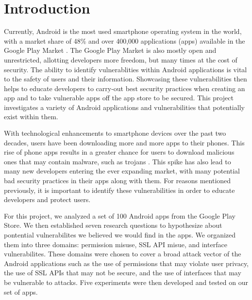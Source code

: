 \section{Introduction}




Currently, Android is the most used smartphone operating system in the world, with a market share of 48\% and over 400,000 applications (apps) available in the Google Play Market \cite{10.1145/2382196.2382205}. The Google Play
Market is also mostly open and unrestricted, allotting developers more freedom, but many times at the cost of security. 
The ability to identify vulnerablities within Android applications is vital to the safety of users and their information. Showcasing these vulnerabilities then
helps to educate developers to carry-out best security practices when creating an app and to take vulnerable apps off the app store to be secured. This project investigates a variety of Android applications and vulnerabilities that potentially 
exist within them. 

With technological enhancements to smartphone devices over the past two decades, users have been downloading more and more apps to their phones. This rise of phone apps results in a greater chance for users to download malicious ones 
that may contain malware, such as trojans \cite{10.1145/1653662.1653691}. This spike has also lead to many new developers entering the ever expanding market, with many potential bad security practices in their apps along with them. For reasons mentioned previously, 
it is important to identify these vulnerabilities in order to educate developers and protect users. 

For this project, we analyzed a set of 100 Android apps from the Google Play Store. We then established seven research questions to hypothesize about pontential vulnerabilites we believed we would find in the apps. We organized them into three domains: permission misuse, 
SSL API misue, and interface vulnerabilites. These domains were chosen to cover a broad attack vector of the Android applications such as the use of permissions that may violate user privacy, the use of SSL APIs that may not be secure, and the use of interfaces that may be vulnerable to attacks.
Five experiments were then developed and tested on our set of apps. 

